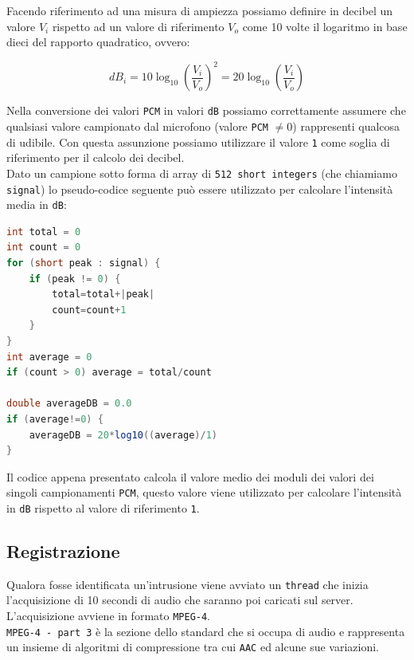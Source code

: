 Facendo riferimento ad una misura di ampiezza possiamo definire in decibel un valore $V_i$ rispetto ad un valore di riferimento $V_o$ come 10 volte il logaritmo in base dieci del rapporto quadratico, ovvero:

\begin{equation}
dB_i = 10\log_{10} \left(\frac{V_i}{V_o}\right)^2 = 20\log_{10} \left(\frac{V_i}{V_o}\right)
\end{equation}

Nella conversione dei valori \texttt{PCM} in valori \texttt{dB} possiamo correttamente assumere che qualsiasi valore campionato dal microfono (valore \texttt{PCM} $\neq 0$) rappresenti qualcosa di udibile. Con questa assunzione possiamo utilizzare il valore \texttt{1} come soglia di riferimento per il calcolo dei decibel.\\

Dato un campione sotto forma di array di \texttt{512 short integers} (che chiamiamo \texttt{signal}) lo pseudo-codice seguente può essere utilizzato per calcolare l'intensità media in \texttt{dB}:

\begin{lstlisting}[language=Java, caption=Pseudo-codice per calcolare i valori in decibel da campionamento PCM]
int total = 0
int count = 0
for (short peak : signal) {
	if (peak != 0) {
		total=total+|peak|
		count=count+1
	}
}
int average = 0
if (count > 0) average = total/count

double averageDB = 0.0
if (average!=0) {
	averageDB = 20*log10((average)/1)
}
\end{lstlisting}

Il codice appena presentato calcola il valore medio dei moduli dei valori dei singoli campionamenti \texttt{PCM}, questo valore viene utilizzato per calcolare l'intensità in \texttt{dB} rispetto al valore di riferimento \texttt{1}.

\subsection{Registrazione}
Qualora fosse identificata un'intrusione viene avviato un \texttt{thread} che inizia l'acquisizione di 10 secondi di audio che saranno poi caricati sul server.\\

L'acquisizione avviene in formato \texttt{MPEG-4}.\\

\texttt{MPEG-4 - part 3} è la sezione dello standard che si occupa di audio e rappresenta un insieme di algoritmi di compressione tra cui \texttt{AAC} ed alcune sue variazioni.\\

